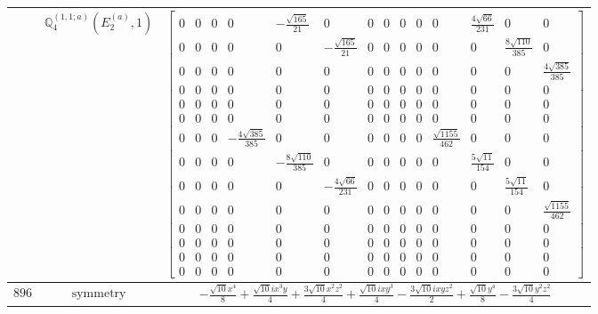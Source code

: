 \documentclass[fleqn,8pt,landscape]{jsarticle}
\begin{document}
\begin{longtable}{ccc}
$  $ & $ \mathbb{Q}_{4}^{(1,1;a)}(E_{2}^{(a)},1) $ & $ \begin{bmatrix} 0 & 0 & 0 & 0 & - \frac{\sqrt{165}}{21} & 0 & 0 & 0 & 0 & 0 & 0 & \frac{4 \sqrt{66}}{231} & 0 & 0 \\ 0 & 0 & 0 & 0 & 0 & - \frac{\sqrt{165}}{21} & 0 & 0 & 0 & 0 & 0 & 0 & \frac{8 \sqrt{110}}{385} & 0 \\ 0 & 0 & 0 & 0 & 0 & 0 & 0 & 0 & 0 & 0 & 0 & 0 & 0 & \frac{4 \sqrt{385}}{385} \\ 0 & 0 & 0 & 0 & 0 & 0 & 0 & 0 & 0 & 0 & 0 & 0 & 0 & 0 \\ 0 & 0 & 0 & 0 & 0 & 0 & 0 & 0 & 0 & 0 & 0 & 0 & 0 & 0 \\ 0 & 0 & 0 & 0 & 0 & 0 & 0 & 0 & 0 & 0 & 0 & 0 & 0 & 0 \\ 0 & 0 & 0 & - \frac{4 \sqrt{385}}{385} & 0 & 0 & 0 & 0 & 0 & 0 & \frac{\sqrt{1155}}{462} & 0 & 0 & 0 \\ 0 & 0 & 0 & 0 & - \frac{8 \sqrt{110}}{385} & 0 & 0 & 0 & 0 & 0 & 0 & \frac{5 \sqrt{11}}{154} & 0 & 0 \\ 0 & 0 & 0 & 0 & 0 & - \frac{4 \sqrt{66}}{231} & 0 & 0 & 0 & 0 & 0 & 0 & \frac{5 \sqrt{11}}{154} & 0 \\ 0 & 0 & 0 & 0 & 0 & 0 & 0 & 0 & 0 & 0 & 0 & 0 & 0 & \frac{\sqrt{1155}}{462} \\ 0 & 0 & 0 & 0 & 0 & 0 & 0 & 0 & 0 & 0 & 0 & 0 & 0 & 0 \\ 0 & 0 & 0 & 0 & 0 & 0 & 0 & 0 & 0 & 0 & 0 & 0 & 0 & 0 \\ 0 & 0 & 0 & 0 & 0 & 0 & 0 & 0 & 0 & 0 & 0 & 0 & 0 & 0 \\ 0 & 0 & 0 & 0 & 0 & 0 & 0 & 0 & 0 & 0 & 0 & 0 & 0 & 0 \end{bmatrix} $ \\ \hline
$ 896 $ & $ \text{symmetry} $ & $ - \frac{\sqrt{10} x^{4}}{8} + \frac{\sqrt{10} i x^{3} y}{4} + \frac{3 \sqrt{10} x^{2} z^{2}}{4} + \frac{\sqrt{10} i x y^{3}}{4} - \frac{3 \sqrt{10} i x y z^{2}}{2} + \frac{\sqrt{10} y^{4}}{8} - \frac{3 \sqrt{10} y^{2} z^{2}}{4} $ \\

\end{longtable}
\end{document}
